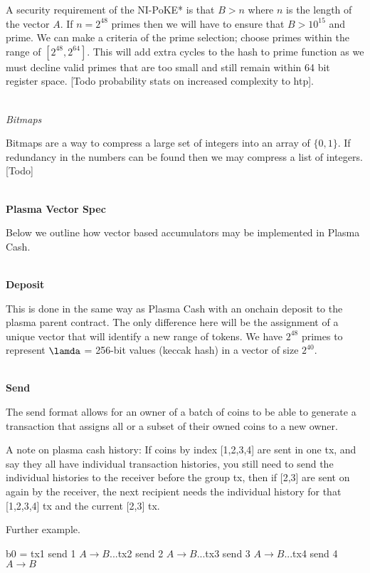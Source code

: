 \documentclass[11pt]{article}
\begin{document}
A security requirement of the NI-PoKE* is that $B > n$ where $n$ is the length of the vector $A$. If $n=2^{48}$ primes then we will have to ensure that $B > 10^{15}$ and prime. We can make a criteria of the prime selection; choose primes within the range of $[2^{48}, 2^{64}]$. This will add extra cycles to the hash to prime function as we must decline valid primes that are too small and still remain within 64 bit register space. [Todo probability stats on increased complexity to htp].
\\
\\

\centerline{\textit{Bitmaps}}

Bitmaps are a way to compress a large set of integers into an array of $\{0,1\}$. If redundancy in the numbers can be found then we may compress a list of integers. [Todo]
\\
\\

\centerline{\textbf{Plasma Vector Spec}}

Below we outline how vector based accumulators may be implemented in Plasma Cash.
\\
\\

\centerline{\textbf{Deposit}}

This is done in the same way as Plasma Cash with an onchain deposit to the plasma parent contract. The only difference here will be the assignment of a unique vector that will identify a new range of tokens. We have $2^{48}$ primes to represent $\lamda$ = 256-bit values (keccak hash) in a vector of size $2^{40}$. 
\\
\\

\centerline{\textbf{Send}}

The send format allows for an owner of a batch of coins to be able to generate a transaction that assigns all or a subset of their owned coins to a new owner. 

A note on plasma cash history:
If coins by index [1,2,3,4] are sent in one tx, and say they all have individual transaction histories, you still need to send the individual histories to the receiver before the group tx, then if [2,3] are sent on again by the receiver, the next recipient needs the individual history for that [1,2,3,4] tx and the current [2,3] tx.

Further example.

b0 = tx1 send 1 $A\rightarrow B$...tx2 send 2 $A\rightarrow B$...tx3 send 3 $A\rightarrow B$...tx4 send 4 $A\rightarrow B$
\end{document}
